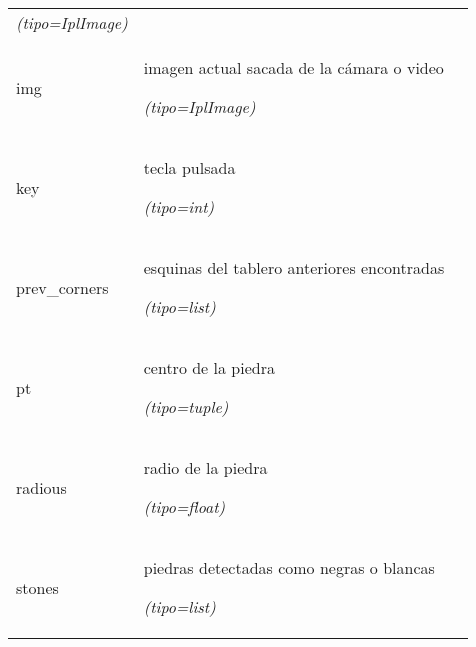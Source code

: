 \begin{longtable}{|p{\varnamewidth}|p{\vardescrwidth}|l}
            {\it (tipo=IplImage)}&\\
\cline{1-2}
\raggedright i\-m\-g\- & \raggedright imagen actual sacada de la cámara o video

            {\it (tipo=IplImage)}&\\
\cline{1-2}
\raggedright k\-e\-y\- & \raggedright tecla pulsada

            {\it (tipo=int)}&\\
\cline{1-2}
\raggedright p\-r\-e\-v\-\_\-c\-o\-r\-n\-e\-r\-s\- & \raggedright esquinas del tablero anteriores encontradas

            {\it (tipo=list)}&\\
\cline{1-2}
\raggedright p\-t\- & \raggedright centro de la piedra

            {\it (tipo=tuple)}&\\
\cline{1-2}
\raggedright r\-a\-d\-i\-o\-u\-s\- & \raggedright radio de la piedra

            {\it (tipo=float)}&\\
\cline{1-2}
\raggedright s\-t\-o\-n\-e\-s\- & \raggedright piedras detectadas como negras o blancas

            {\it (tipo=list)}&\\
\cline{1-2}
\end{longtable}

